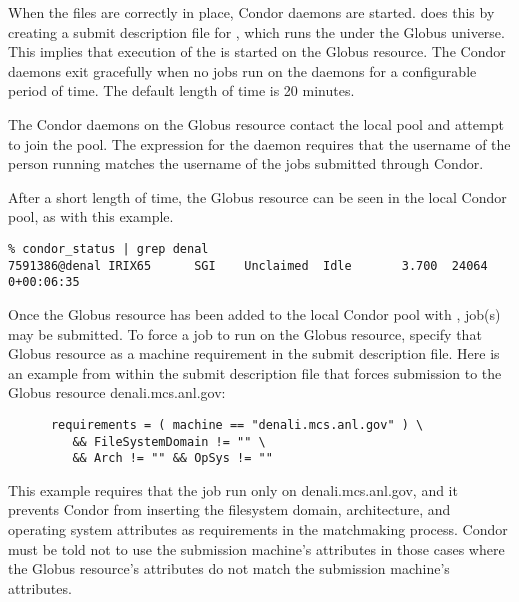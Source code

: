 When the files are correctly in place,
Condor daemons are started.
 does this by creating a submit description file for
, which runs the  under the Globus
universe.
This implies that execution of the  is started on the Globus
resource.
The Condor daemons exit gracefully when no jobs run on the daemons for a
configurable period of time. The default length of time is 20 minutes.

The Condor daemons on the Globus resource contact the local pool and
attempt to join the pool.  The 
expression for the  daemon requires that the username
of the person running  matches the username of the jobs
submitted through Condor.

After a short length of time,
the Globus resource can be seen in the local Condor pool,
as with this example.

\footnotesize
\begin{verbatim}
% condor_status | grep denal
7591386@denal IRIX65      SGI    Unclaimed  Idle       3.700  24064  0+00:06:35
\end{verbatim}
\normalsize

Once the Globus resource has been added to the local Condor
pool with ,
job(s) may be submitted.
To force a job to run on the Globus resource,
specify that Globus resource as a machine requirement
in the submit description file. 
Here is an example from within the submit description file
that forces submission to the Globus resource denali.mcs.anl.gov:
\begin{verbatim}
      requirements = ( machine == "denali.mcs.anl.gov" ) \
         && FileSystemDomain != "" \
         && Arch != "" && OpSys != ""
\end{verbatim}
This example requires that the job run only on denali.mcs.anl.gov,
and it prevents Condor from inserting the filesystem domain,
architecture, and operating system attributes as requirements
in the matchmaking process.
Condor must be told not to use the submission machine's
attributes in those cases
where the Globus resource's attributes
do not match the submission machine's attributes.
